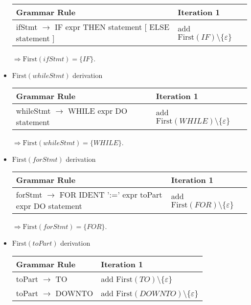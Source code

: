 \documentclass[8pt]{scrartcl}
\newcommand{\First}[1]{\mathrm{First}(#1)}
\newcommand{\epsset}{\{\varepsilon\}}
\begin{document}
\begin{itemize}
\begin{tabular}{|l |l |}
                    \hline
                    \textbf{Grammar Rule} & \textbf{Iteration 1}\\
                    \hline
                    ifStmt $\rightarrow$ IF expr THEN statement [ ELSE statement ] & add $\First{IF} \setminus \epsset$\\
                    \hline
                \end{tabular}\newline
                $\Rightarrow \First{ifStmt} = \{IF\}$.
            \item $\First{whileStmt}$ derivation\newline
                \begin{tabular}{|l |l |}
                    \hline
                    \textbf{Grammar Rule} & \textbf{Iteration 1}\\
                    \hline
                    whileStmt $\rightarrow$ WHILE expr DO statement & add $\First{WHILE} \setminus \epsset$\\
                    \hline
                \end{tabular}\newline
                $\Rightarrow \First{whileStmt} = \{WHILE\}$.
            \item $\First{forStmt}$ derivation\newline
                \begin{tabular}{|l |l |}
                    \hline
                    \textbf{Grammar Rule} & \textbf{Iteration 1}\\
                    \hline
                    forStmt $\rightarrow$ FOR IDENT ':=' expr toPart expr DO statement & add $\First{FOR} \setminus \epsset$\\
                    \hline
                \end{tabular}\newline
                $\Rightarrow \First{forStmt} = \{FOR\}$.
            \item $\First{toPart}$ derivation\newline
                \begin{tabular}{|l |l |}
                    \hline
                    \textbf{Grammar Rule} & \textbf{Iteration 1}\\
                    \hline
                    toPart $\rightarrow$ TO & add $\First{TO} \setminus \epsset$\\
                    \hline
                    toPart $\rightarrow$ DOWNTO & add $\First{DOWNTO} \setminus \epsset$\\

\end{tabular}
\end{itemize}
\end{document}
